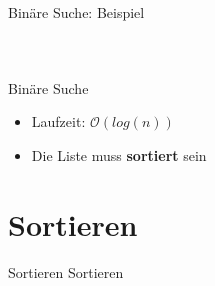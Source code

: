 \documentclass[18pt]{beamer}
\begin{document}
\begin{frame}{Binäre Suche: Beispiel}
\begin{center}
\begin{tabular}{|c|c|c|c|c|c|c|c|c|c|c|c|c|c|c|c|}
            \hline
        \end{tabular}
        \pause
        \begin{tabular}{|c|c|c|c|c|c|c|c|c|c|c|c|c|c|c|c|}
            \hline
            \cellcolor{darkgrey}{3} & \cellcolor{darkgrey}{4} & \cellcolor{darkgrey}{4} & \cellcolor{darkgrey}{5} & \cellcolor{darkgrey}{6} & \cellcolor{darkgrey}{7} & \cellcolor{lime}{9} & \cellcolor{lightgreen}{10} & \cellcolor{darkgrey}{11} & \cellcolor{darkgrey}{14} & \cellcolor{darkgrey}{17} & \cellcolor{darkgrey}{22} & \cellcolor{darkgrey}{24} & \cellcolor{darkgrey}{29} & \cellcolor{darkgrey}{32} & \cellcolor{darkgrey}{42} \\
            \hline
        \end{tabular}
        \pause
        \begin{tabular}{|c|c|c|c|c|c|c|c|c|c|c|c|c|c|c|c|}
            \hline
            \cellcolor{darkgrey}{3} & \cellcolor{darkgrey}{4} & \cellcolor{darkgrey}{4} & \cellcolor{darkgrey}{5} & \cellcolor{darkgrey}{6} & \cellcolor{darkgrey}{7} & \cellcolor{awesome}{9} & \cellcolor{darkgrey}{10} & \cellcolor{darkgrey}{11} & \cellcolor{darkgrey}{14} & \cellcolor{darkgrey}{17} & \cellcolor{darkgrey}{22} & \cellcolor{darkgrey}{24} & \cellcolor{darkgrey}{29} & \cellcolor{darkgrey}{32} & \cellcolor{darkgrey}{42} \\
            \hline
        \end{tabular}
    \end{center}
\end{frame}


\begin{frame}{Binäre Suche}
    \begin{itemize}
        \item Laufzeit: $\mathcal{O}(log(n))$
        \item Die Liste muss \textbf{sortiert} sein
    \end{itemize}
\end{frame}

\section{Sortieren}

\begin{frame}{Sortieren}
    \center
    \Huge{Sortieren}
\end{frame}
\end{document}
